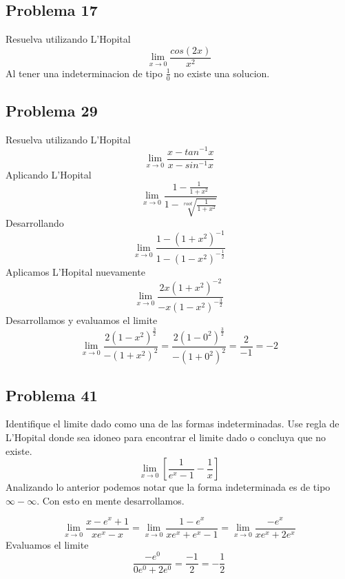\documentclass{article}
\begin{document}
\subsection{Problema 17}
Resuelva utilizando L'Hopital
\setcounter{equation}{0}
\begin{equation}
    \lim_{x\to 0}\frac{cos(2x)}{x^2}
\end{equation}
Al tener una indeterminacion de tipo $\frac{1}{0}$ no existe una solucion.

\subsection{Problema 29}
Resuelva utilizando L'Hopital
\setcounter{equation}{0}
\begin{equation}
    \lim_{x\to 0} \frac{x-tan^{-1}x}{x-sin^{-1}x}
\end{equation}
Aplicando L'Hopital
\begin{equation}
    \lim_{x\to 0} \frac{1-\frac{1}{1+x^2}}{1-\sqrt[root]{\frac{1}{1+x^2}}}
\end{equation}
Desarrollando
\begin{equation}
    \lim_{x\to 0}\frac{1-(1+x^2)^{-1}}{1-(1-x^2)^{-\frac{1}{2}}}
\end{equation}
Aplicamos L'Hopital nuevamente
\begin{equation}
    \lim_{x\to 0}\frac{2x(1+x^2)^{-2}}{-x(1-x^2)^{-\frac{3}{2}}}
\end{equation}
Desarrollamos y evaluamos el limite
\begin{equation}
    \lim_{x\to 0}\frac{2(1-x^2)^{\frac{3}{2}}}{-(1+x^2)^2} = \frac{2(1-0^2)^{\frac{3}{2}}}{-(1+0^2)^2} = \frac{2}{-1} = -2
\end{equation}
\subsection{Problema 41}
Identifique el limite dado como una de las formas indeterminadas. Use regla de L'Hopital donde sea idoneo para encontrar el limite dado o concluya que no existe.
\setcounter{equation}{0}
\begin{equation}
    \lim_{x\to 0}\left[\frac{1}{e^x-1}-\frac{1}{x}\right]
\end{equation}
Analizando lo anterior podemos notar que la forma indeterminada es de tipo $\infty - \infty$. Con esto en mente desarrollamos.

\begin{equation}
    \lim_{x\to 0}\frac{x-e^x+1}{xe^x-x}=\lim_{x\to 0} \frac{1-e^x}{xe^x+e^x-1} = \lim_{x\to 0}\frac{-e^x}{xe^x+2e^x}
\end{equation}
Evaluamos el limite
\begin{equation}
    \frac{-e^0}{0e^0+2e^0} = \frac{-1}{2} = -\frac{1}{2}
\end{equation}
\end{document}
